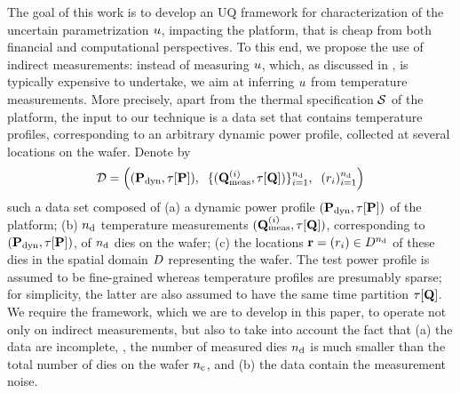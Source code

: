 The goal of this work is to develop an UQ framework for characterization of the uncertain parametrization $u$, impacting the platform, that is cheap from both financial and computational perspectives. To this end, we propose the use of indirect measurements: instead of measuring $u$, which, as discussed in , is typically expensive to undertake, we aim at inferring $u$ from temperature measurements. More precisely, apart from the thermal specification $\mathcal{S}$ of the platform, the input to our technique is a data set that contains temperature profiles, corresponding to an arbitrary dynamic power profile, collected at several locations on the wafer. Denote by
\[
  \mathcal{D} = \left( (\mathbf{P}_{\text{dyn}}, \tau[\mathbf{P}]), \; \; \{ (\mathbf{Q}^{(i)}_{\text{meas}}, \tau[\mathbf{Q}]) \}_{i = 1}^{n_{\text{d}}}, \; \; ( r_i )_{i = 1}^{n_{\text{d}}} \right)
\]
such a data set composed of (a) a dynamic power profile $(\mathbf{P}_{\text{dyn}}, \tau[\mathbf{P}])$ of the platform; (b) ${n_{\text{d}}}$ temperature measurements $(\mathbf{Q}^{(i)}_{\text{meas}}, \tau[\mathbf{Q}])$, corresponding to $(\mathbf{P}_{\text{dyn}}, \tau[\mathbf{P}])$, of ${n_{\text{d}}}$ dies on the wafer; (c) the locations $\mathbf{r} = (r_i) \in D^{n_{\text{d}}}$ of these dies in the spatial domain $D$ representing the wafer. The test power profile is assumed to be fine-grained whereas temperature profiles are presumably sparse; for simplicity, the latter are also assumed to have the same time partition $\tau[\mathbf{Q}]$. We require the framework, which we are to develop in this paper, to operate not only on indirect measurements, but also to take into account the fact that (a) the data are incomplete, \ie, the number of measured dies ${n_{\text{d}}}$ is much smaller than the total number of dies on the wafer ${n_{\text{c}}}$, and (b) the data contain the measurement noise.

